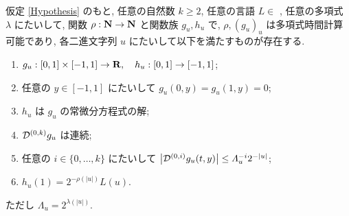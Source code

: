  \begin{lemma}
  \label{KTimesFamily}
  仮定 \ref{Hypothesis} のもと, 任意の自然数 $k \ge 2$,
  任意の言語 $L \in$ \PSPACE, 任意の多項式 $\lambda$ にたいして,
  関数 $\rho : \mathbf N \to \mathbf N$ と関数族 $g_u, h_u$ で,
  $\rho, (g_u)_u$ は多項式時間計算可能であり,
  各二進文字列 $u$ にたいして以下を満たすものが存在する.
  \begin{enumerate}
   \item $g_u:[0,1] \times [-1,1]\to \mathbf R, \quad h_u: [0,1] \to [-1,1]$;
   \item 任意の $y \in [-1,1]$ にたいして $g_u(0,y) = g_u(1,y) = 0 $;
   \item $h_u$ は $g_u$ の常微分方程式の解;
   \item $\mathcal D^{(0,k)} g_u$ は連続;
   \item 任意の $i \in \{0, \dots, k\}$ にたいして
	 $\left|\mathcal D^{(0,i)} g_u(t,y)\right| 
		\le \varLambda_u^{-i}2^{-|u|}$;
	 \label{enum:lem:differentiable}
   \item $h_u(1) = 2^{-\rho(|u|)}L(u)$.
  \end{enumerate}
  ただし $\Lambda_u = 2^{\lambda(|u|)}$.
 \end{lemma}
 

